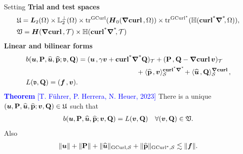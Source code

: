 \documentclass[10pt, compress]{beamer}
\begin{document}
\begin{frame}{Setting}
\textbf{Trial and test spaces}
\begin{align*}
    &\UU = \bL_2(\Omega) \times \LL^\perp_2(\Omega) \times \tracegc{}(\HGradCurlz{\Omega}) \times \tra{}(\HGradCurla{\Omega}), \\
    &\VV = \HGradCurl{\cT} \times \HGradCurla{\cT} %
\end{align*}
\textbf{Linear and bilinear forms} 
    \begin{align*}   
  & b(\bu,\PP,\tbu,\tPP;\vv,\QQ) = \vdual{\bu}{\gamma \bv+\GCurla\QQ}_{\cT}+\vdual{\PP}{\QQ-\Grad\Curl \bv }_{\cT} 
  \\& \hspace{16 em} + \dualgca{\tPP}{\bv}_{\cS}+\dualgc{\tbu}{\QQ}_{\cS}, \\ 
  &L(\vv,\QQ)=\vdual{\ff}{\bv}. 
\end{align*}
\textcolor{blue}{\textbf{Theorem} [T. F\"uhrer, P. Herrera, N. Heuer, 2023]}
There is a unique $(\boldsymbol{u},\mathbf{P},\widehat{\boldsymbol{u}},\widehat{\mathbf{p}};\boldsymbol{v},\mathbf{Q}) \in \mathfrak{U} $ such that 
\begin{align*}
    b(\boldsymbol{u},\mathbf{P},\widehat{\boldsymbol{u}},\widehat{\mathbf{p}};\boldsymbol{v},\mathbf{Q}) = L(\boldsymbol{v},\mathbf{Q}) \quad \forall (\boldsymbol{v},\mathbf{Q}) \in \mathfrak{V}.  
\end{align*}   
Also 
\begin{align*}
    \|\boldsymbol{u}\| + \|\mathbf{P}\|+\|\widehat{\boldsymbol{u}}\|_{\mathrm{GCurl},\mathcal{S}}+\|\widehat{\mathbf{p}}\|_{\mathrm{GCurl}^{*},\mathcal{S}} \lesssim \|\boldsymbol{f}\|.
\end{align*}

\end{frame}
\end{document}
